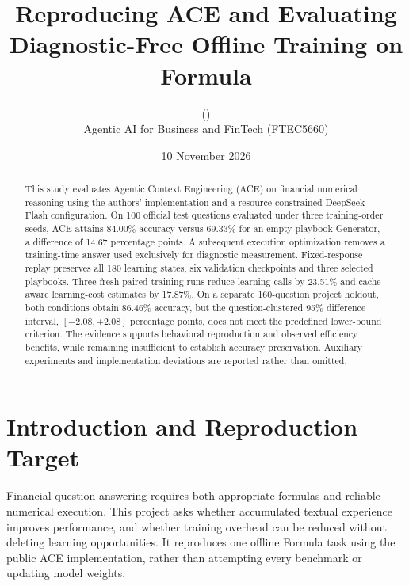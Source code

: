 \documentclass[10pt,a4paper]{article}
\title{\vspace{-13mm}\LARGE\bfseries Reproducing ACE and Evaluating\\Diagnostic-Free Offline Training on Formula}
\author{\reportauthor\quad (\studentid)\\\small Agentic AI for Business and FinTech (FTEC5660)}
\date{10 November 2026}
\begin{document}
\maketitle\thispagestyle{fancy}
\vspace{-5mm}
\begin{abstract}
\noindent This study evaluates Agentic Context Engineering (ACE) on financial numerical reasoning using the authors' implementation and a resource-constrained DeepSeek Flash configuration. On 100 official test questions evaluated under three training-order seeds, ACE attains 84.00\% accuracy versus 69.33\% for an empty-playbook Generator, a difference of 14.67 percentage points. A subsequent execution optimization removes a training-time answer used exclusively for diagnostic measurement. Fixed-response replay preserves all 180 learning states, six validation checkpoints and three selected playbooks. Three fresh paired training runs reduce learning calls by 23.51\% and cache-aware learning-cost estimates by 17.87\%. On a separate 160-question project holdout, both conditions obtain 86.46\% accuracy, but the question-clustered 95\% difference interval, $[-2.08,+2.08]$ percentage points, does not meet the predefined lower-bound criterion. The evidence supports behavioral reproduction and observed efficiency benefits, while remaining insufficient to establish accuracy preservation. Auxiliary experiments and implementation deviations are reported rather than omitted.
\end{abstract}
\section{Introduction and Reproduction Target}
Financial question answering requires both appropriate formulas and reliable numerical execution. This project asks whether accumulated textual experience improves performance, and whether training overhead can be reduced without deleting learning opportunities. It reproduces one offline Formula task using the public ACE implementation, rather than attempting every benchmark or updating model weights.
\end{document}
